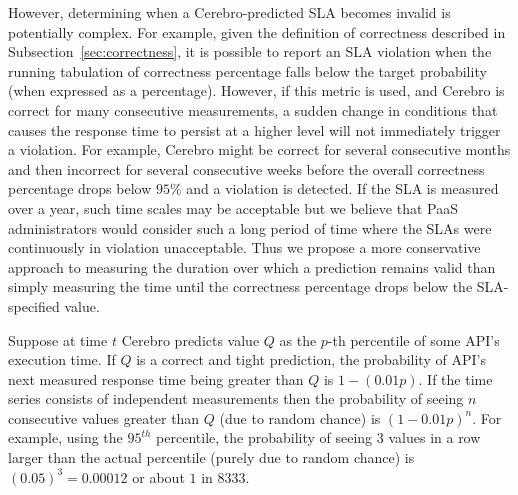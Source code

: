 
However, determining when a Cerebro-predicted SLA becomes invalid is
potentially complex. For example, given the definition of correctness
described in Subsection~\ref{sec:correctness}, it is possible to report an SLA violation
when the running tabulation of correctness percentage falls below the target
probability (when expressed as a percentage).  However, if this metric is
used, and Cerebro is correct for many consecutive measurements, a sudden
change in conditions that causes the response time to persist at a higher
level will not immediately trigger a violation.  For example, Cerebro might be
correct for several consecutive months and then incorrect for several
consecutive weeks before the overall correctness percentage drops below $95\%$
and a violation is detected.  If the SLA is measured over a year, such time
scales may be acceptable but we believe that PaaS administrators would
consider such a long period of time where the SLAs were continuously in
violation unacceptable.
Thus we propose a more conservative approach to measuring the duration over
which a prediction remains valid than simply measuring the time until the
correctness percentage drops below the SLA-specified value.

Suppose at time $t$ Cerebro predicts value $Q$ as the $p$-th percentile of
some API's execution time.  If $Q$ is a correct and tight prediction,
the probability of API's next measured response time being greater than 
$Q$ is $1-(0.01p)$.  If the time series consists of independent
measurements then the probability of seeing $n$ consecutive values greater
than $Q$ (due to random chance) is $(1-0.01p)^n$. 
For example, using the $95^{th}$ percentile, the probability of seeing $3$
values in a row larger than the actual percentile (purely due to random chance)
is $(0.05)^3 = 0.00012$ or about $1$ in $8333$.

